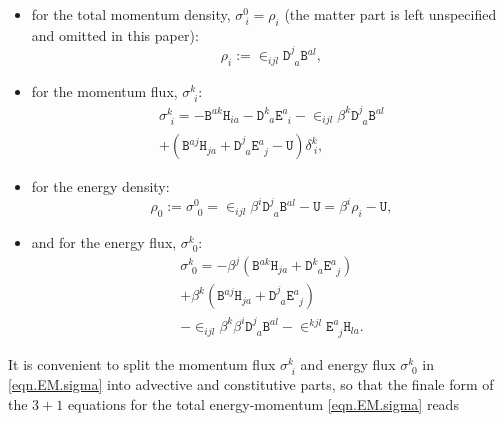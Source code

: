 \documentclass[
10pt, %
a4paper, %
oneside, %
twocolumn,
headinclude,footinclude, %
BCOR5mm, %
]{scrartcl}
\newcommand{\Dfin}[2]{\mathtt{D}_{\phantom{#2}#1}^{#2}}	%
\newcommand{\Hfin}[2]{\mathtt{H}_{#2#1}}	%
\newcommand{\Efin}[2]{\mathtt{E}^{#1}_{\phantom{#1}#2}}	%
\newcommand{\Ufin}{\mathtt{U}}
\newcommand{\Bfin}[2]{\mathtt{B}^{#1#2}}	%
\newcommand{\EMmat}[2]{\sigma^{#1}_{\ \,#2}}
\newcommand{\LCsymb}{\bm{\in}}    %
\newcommand{\KD}[2]{\delta^{#1}_{\ #2}}
\begin{document}
	\begin{itemize}
		\item 
		for the total momentum density, $ \sigma^0_{\ i} = \rho_i $ (the matter part is left 
		unspecified and omitted in this paper):
		\begin{equation}\label{eqn.sigma0i}
			\rho_i :=\LCsymb_{ijl}\Dfin{a}{j}\Bfin{a}{l},
		\end{equation}
		\item
		for the momentum flux, $ \EMmat{k}{i}$:
		\begin{multline}\label{eqn.sigmaki}
			\EMmat{k}{i} = -\Bfin{a}{k} \Hfin{a}{i} - \Dfin{a}{k} \Efin{a}{i}  
			- \LCsymb_{ijl} 
			\beta^k \Dfin{a}{j}\Bfin{a}{l} \\
			+ (\Bfin{a}{j} \Hfin{a}{j} + \Dfin{a}{j} \Efin{a}{j} 
			- \Ufin)\KD{k}{i},
		\end{multline}
		\item
		for the energy density:
		\begin{equation}\label{eqn.sigma00}
			\rho_0 :=\EMmat{0}{0} = \LCsymb_{ijl} 
			\beta^i\Dfin{a}{j}\Bfin{a}{l} - \Ufin = \beta^i 
			\rho_i 
			- \Ufin,
		\end{equation}
		\item
		and for the energy flux, $ \EMmat{k}{0} $:
		\begin{multline}\label{eqn.sigmak0}
			{\EMmat{k}{0}} = -\beta^j( \Bfin{a}{k} \Hfin{a}{j} + \Dfin{a}{k} \Efin{a}{j}) \\
			+
			\beta^k( \Bfin{a}{j} \Hfin{a}{j} + \Dfin{a}{j} \Efin{a}{j}) \\
			-
			\LCsymb_{ijl}\beta^k\beta^i\Dfin{a}{j}\Bfin{a}{l}
			-
			\LCsymb^{kjl} \Efin{a}{j}\Hfin{a}{l}.
		\end{multline}
	\end{itemize}
	It is convenient to split the momentum flux $ \EMmat{k}{i} $ and energy
	flux $ \EMmat{k}{0} $ in \eqref{eqn.EM.sigma} into advective and
	constitutive parts, so that the finale form of the $ 3+1 $ equations for the
	total energy-momentum \eqref{eqn.EM.sigma} reads
\end{document}
